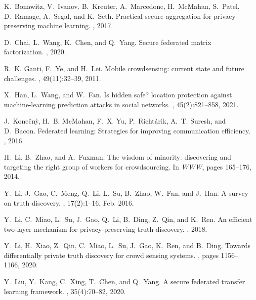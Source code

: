 \documentclass[11pt]{article}
\begin{document}
\begin{thebibliography}{10}

K.~Bonawitz, V.~Ivanov, B.~Kreuter, A.~Marcedone, H.~McMahan, S.~Patel,
  D.~Ramage, A.~Segal, and K.~Seth.
\newblock Practical secure aggregation for privacy-preserving machine learning.
, 2017.

D.~Chai, L.~Wang, K.~Chen, and Q.~Yang.
\newblock Secure federated matrix factorization.
, 2020.

R.~K. Ganti, F.~Ye, and H.~Lei.
\newblock Mobile crowdsensing: current state and future challenges.
, 49(11):32--39, 2011.

X.~Han, L.~Wang, and W.~Fan.
\newblock Is hidden safe? location protection against machine-learning
  prediction attacks in social networks.
, 45(2):821--858, 2021.

J.~Kone{\v{c}}n{\`y}, H.~B. McMahan, F.~X. Yu, P.~Richt{\'a}rik, A.~T. Suresh,
  and D.~Bacon.
\newblock Federated learning: Strategies for improving communication
  efficiency.
, 2016.

H.~{Li}, B.~{Zhao}, and A.~{Fuxman}.
\newblock The wisdom of minority: discovering and targeting the right group of
  workers for crowdsourcing.
\newblock In {\em WWW}, pages 165--176, 2014.

Y.~Li, J.~Gao, C.~Meng, Q.~Li, L.~Su, B.~Zhao, W.~Fan, and J.~Han.
\newblock A survey on truth discovery.
, 17(2):1–16, Feb. 2016.

Y.~Li, C.~Miao, L.~Su, J.~Gao, Q.~Li, B.~Ding, Z.~Qin, and K.~Ren.
\newblock An efficient two-layer mechanism for privacy-preserving truth
  discovery.
, 2018.

Y.~Li, H.~Xiao, Z.~Qin, C.~Miao, L.~Su, J.~Gao, K.~Ren, and B.~Ding.
\newblock Towards differentially private truth discovery for crowd sensing
  systems.
, pages 1156--1166, 2020.

Y.~{Liu}, Y.~{Kang}, C.~{Xing}, T.~{Chen}, and Q.~{Yang}.
\newblock A secure federated transfer learning framework.
, 35(4):70--82, 2020.


\end{thebibliography}
\end{document}
